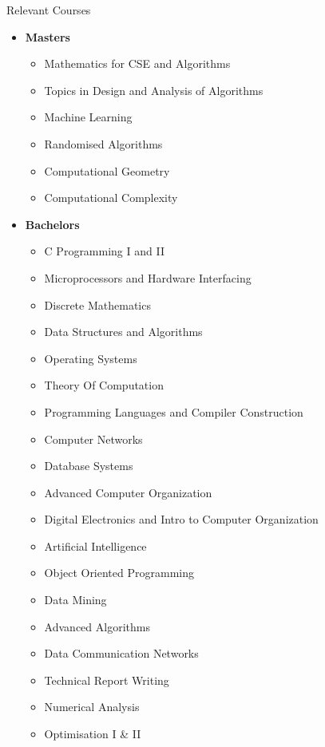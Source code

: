\documentclass[11pt,oneside]{article}
\newenvironment{ressection}[1]{
	\vspace{4pt}
	{\fontfamily{phv}\selectfont\Large#1}
	\begin{itemize}
	\vspace{3pt}
}{
	\end{itemize}
}
\newcommand{\resitem}[1]{
	\vspace{-4pt}
	\item \begin{flushleft} #1 \end{flushleft}
}
\newcommand{\ressubitem}[1]{
	\vspace{-1pt}
	\item \begin{flushleft} #1 \end{flushleft}
}
\newenvironment{reslist}[1]{
	\resitem{\textbf{#1}}
	\vspace{-5pt}
	\begin{itemize}
}{
	\end{itemize}
}
\begin{document}
\begin{ressection}{Relevant Courses}

\begin{reslist}{Masters}

 \ressubitem{Mathematics for CSE and  Algorithms}
 \ressubitem{Topics in Design and Analysis of Algorithms}
 \ressubitem{Machine Learning}
 \ressubitem{Randomised Algorithms}
 \ressubitem{Computational Geometry}
 \ressubitem{Computational Complexity}

\end{reslist}

\begin{reslist}{Bachelors}

 \ressubitem{C Programming I and II}
 \ressubitem{Microprocessors and Hardware Interfacing}
 \ressubitem{Discrete Mathematics}
 \ressubitem{Data Structures and Algorithms}
 \ressubitem{Operating Systems}
 \ressubitem{Theory Of Computation}
 \ressubitem{Programming Languages and Compiler Construction}
 \ressubitem{Computer Networks}
 \ressubitem{Database Systems}
 \ressubitem{Advanced Computer Organization}
 \ressubitem{Digital Electronics and Intro to Computer Organization}
 \ressubitem{Artificial Intelligence}
 \ressubitem{Object Oriented Programming}
 \ressubitem{Data Mining}
 \ressubitem{Advanced Algorithms}
 \ressubitem{Data Communication Networks}
 \ressubitem{Technical Report Writing}
 \ressubitem{Numerical Analysis}
 \ressubitem{Optimisation I \& II}

\end{reslist}
 
\end{ressection}
\end{document}
